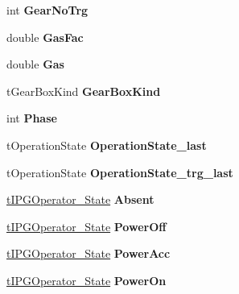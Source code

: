 \begin{DoxyCompactItemize}
int {\bfseries Gear\+No\+Trg}
\item 
\mbox{\label{structt_my_model_ad509cb4e49c6b3cf3a373703cbadd493}} 
double {\bfseries Gas\+Fac}
\item 
\mbox{\label{structt_my_model_a6888ee1d1364e43a69863ae677d16a09}} 
double {\bfseries Gas}
\item 
\mbox{\label{structt_my_model_a10839a49662e89c71e2e21271179e1f6}} 
t\+Gear\+Box\+Kind {\bfseries Gear\+Box\+Kind}
\item 
\mbox{\label{structt_my_model_a3a81d1d7e6e3f3c159cd4fcdd28b6b80}} 
int {\bfseries Phase}
\item 
\mbox{\label{structt_my_model_a5a6a685696bc6e6dafa9172d61874ad0}} 
t\+Operation\+State {\bfseries Operation\+State\+\_\+last}
\item 
\mbox{\label{structt_my_model_a154be20bf9326d925081aadfd4e83a3f}} 
t\+Operation\+State {\bfseries Operation\+State\+\_\+trg\+\_\+last}
\item 
\mbox{\label{structt_my_model_a0824dd6de0d1c10a63e4e57393c6117a}} 
\mbox{\hyperlink{structt_i_p_g_operator___state}{t\+I\+P\+G\+Operator\+\_\+\+State}} {\bfseries Absent}
\item 
\mbox{\label{structt_my_model_a43af3393e2e224bbbcdfc97e498e2a44}} 
\mbox{\hyperlink{structt_i_p_g_operator___state}{t\+I\+P\+G\+Operator\+\_\+\+State}} {\bfseries Power\+Off}
\item 
\mbox{\label{structt_my_model_acdaf4e444dbc39f03b8b9490f4d28893}} 
\mbox{\hyperlink{structt_i_p_g_operator___state}{t\+I\+P\+G\+Operator\+\_\+\+State}} {\bfseries Power\+Acc}
\item 
\mbox{\label{structt_my_model_ade06a720f57fceecc3fb93f6e1815fc2}} 
\mbox{\hyperlink{structt_i_p_g_operator___state}{t\+I\+P\+G\+Operator\+\_\+\+State}} {\bfseries Power\+On}
\item 
\mbox{\label{structt_my_model_aaf7d2bc4b2e699632401dd54a4fc07d3}} 

\end{DoxyCompactItemize}

